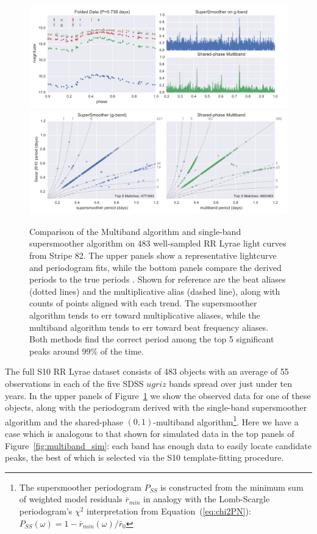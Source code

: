 \documentclass[12pt,preprint]{aastex}
\newcommand{\Fig}[1]{Figure~\ref{fig:#1}}
\newcommand{\fig}[1]{\Fig{#1}}
\newcommand{\figlabel}[1]{\label{fig:#1}}
\newcommand{\Eq}[1]{Equation~(\ref{eq:#1})}
\newcommand{\eq}[1]{\Eq{#1}}
\begin{document}
\begin{figure}
  \centering
  \includegraphics[width=\textwidth]{fig07a.pdf}
  \includegraphics[width=\textwidth]{fig07b.pdf}
  \caption{
    Comparison of the Multiband algorithm and single-band supersmoother algorithm on 483 well-sampled RR Lyrae light curves from Stripe 82.
    The upper panels show a representative lightcurve and periodogram fits, while the bottom panels compare the derived periods to the true periods \citep[Based on a combined SuperSmoother and template-fitting approach; see][]{Sesar2010}.
    Shown for reference are the beat aliases (dotted lines) and the multiplicative alias (dashed line), along with counts of points aligned with each trend.
    The supersmoother algorithm tends to err toward multiplicative aliases, while the multiband algorithm tends to err toward beat frequency aliases.
    Both methods find the correct period among the top 5 significant peaks around 99\% of the time.
  } 
  \figlabel{compare_periods}
\end{figure}

The full S10 RR Lyrae dataset consists of 483 objects with an average of 55 observations in each of the five SDSS $ugriz$ bands spread over just under ten years.  In the upper panels of \fig{compare_periods} we show the observed data for one of these objects, along with the periodogram derived with the single-band supersmoother algorithm and the shared-phase $(0, 1)$-multiband algorithm\footnote{The supersmoother periodogram $P_{SS}$ is constructed from the minimum sum of weighted model residuals $\bar{r}_{min}$ in analogy with the Lomb-Scargle periodogram's $\chi^2$ interpretation from \eq{chi2PN}: $P_{SS}(\omega) = 1 - \bar{r}_{min}(\omega) / \bar{r}_0$}. Here we have a case which is analogous to that shown for simulated data in the top panels of \fig{multiband_sim}: each band has enough data to easily locate candidate peaks, the best of which is selected via the S10 template-fitting procedure.
\end{document}
